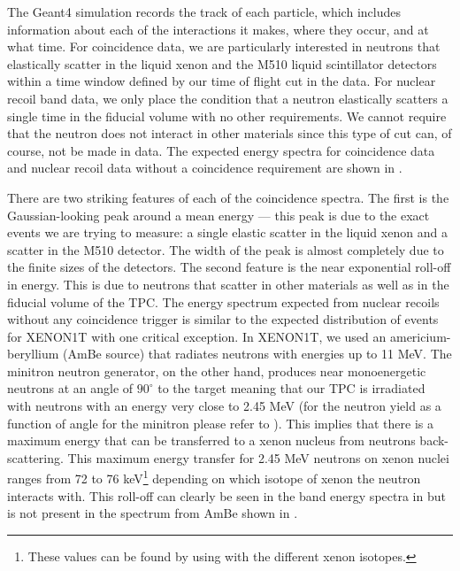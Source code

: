 The Geant4 simulation records the track of each particle, which includes information about each of the interactions it makes, where they occur, and at what time.  For coincidence data, we are particularly interested in neutrons that elastically scatter in the liquid xenon and the M510 liquid scintillator detectors within a time window defined by our time of flight cut in the data.  For nuclear recoil band data, we only place the condition that a neutron elastically scatters a single time in the fiducial volume with no other requirements.  We cannot require that the neutron does not interact in other materials since this type of cut can, of course, not be made in data.  The expected energy spectra for coincidence data and nuclear recoil data without a coincidence requirement are shown in .

There are two striking features of each of the coincidence spectra.  The first is the Gaussian-looking peak around a mean energy --- this peak is due to the exact events we are trying to measure: a single elastic scatter in the liquid xenon and a scatter in the M510 detector.  The width of the peak is almost completely due to the finite sizes of the detectors.  The second feature is the near exponential roll-off in energy.  This is due to neutrons that scatter in other materials as well as in the fiducial volume of the TPC.  The energy spectrum expected from nuclear recoils without any coincidence trigger is similar to the expected distribution of events for XENON1T with one critical exception.  In XENON1T, we used an americium-beryllium (AmBe source) that radiates neutrons with energies up to 11 MeV.  The minitron neutron generator, on the other hand, produces near monoenergetic neutrons at an angle of $90^{\circ}$ to the target meaning that our TPC is irradiated with neutrons with an energy very close to 2.45 MeV (for the neutron yield as a function of angle for the minitron please refer to ).  This implies that there is a maximum energy that can be transferred to a xenon nucleus from neutrons back-scattering.  This maximum energy transfer for 2.45 MeV neutrons on xenon nuclei ranges from 72 to 76 keV\footnote{These values can be found by using  with the different xenon isotopes.} depending on which isotope of xenon the neutron interacts with.  This roll-off can clearly be seen in the band energy spectra in  but is not present in the spectrum from AmBe shown in .



